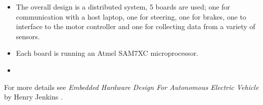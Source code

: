     \renewcommand{\labelitemi}{}
    \begin{itemize}
      \item 
        The overall design is a distributed system, 5 boards are used; one for
        communication with a host laptop, one for steering, one for brakes, one
        to interface to the motor controller and one for collecting data from a
        variety of sensors.

      \item
        Each board is running an Atmel SAM7XC microprocessor.

      \item
        
    \end{itemize}

    For more details see \emph{Embedded Hardware Design For Autonomous Electric
    Vehicle} by Henry Jenkins \cite{jenkins_2011}.
